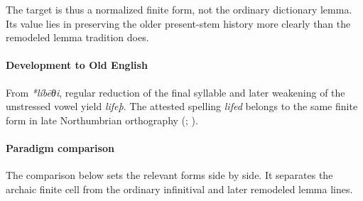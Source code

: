 \documentclass[
  british,
  a4paper,
]{article}
\begin{document}
The target is thus a normalized finite form, not the ordinary dictionary
lemma. Its value lies in preserving the older present-stem history more
clearly than the remodeled lemma tradition does.

\paragraph{Development to Old
English}\label{development-to-old-english-48}

From \emph{*líbēθi}, regular reduction of the final syllable and later
weakening of the unstressed vowel yield \emph{lifeþ}. The attested
spelling \emph{lifed} belongs to the same finite form in late
Northumbrian orthography (; ).

\paragraph{Paradigm comparison}\label{paradigm-comparison-9}

The comparison below sets the relevant forms side by side. It separates
the archaic finite cell from the ordinary infinitival and later
remodeled lemma lines.
\end{document}
